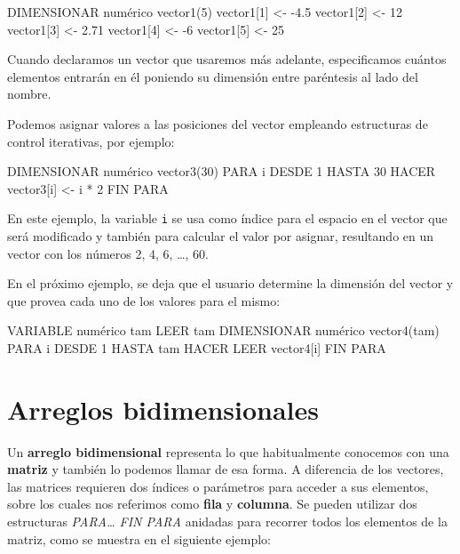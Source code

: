 \documentclass[
]{book}
\newenvironment{Shaded}{\begin{snugshade}}{\end{snugshade}}
\newcommand{\NormalTok}[1]{#1}
\begin{document}
\begin{Shaded}
\begin{Highlighting}[]
\NormalTok{DIMENSIONAR numérico vector1(5)}
\NormalTok{vector1[1] \textless{}{-} {-}4.5}
\NormalTok{vector1[2] \textless{}{-} 12}
\NormalTok{vector1[3] \textless{}{-} 2.71}
\NormalTok{vector1[4] \textless{}{-} {-}6}
\NormalTok{vector1[5] \textless{}{-} 25}
\end{Highlighting}
\end{Shaded}

Cuando declaramos un vector que usaremos más adelante, especificamos cuántos elementos entrarán en él poniendo su dimensión entre paréntesis al lado del nombre.

Podemos asignar valores a las posiciones del vector empleando estructuras de control iterativas, por ejemplo:

\begin{Shaded}
\begin{Highlighting}[]
\NormalTok{DIMENSIONAR numérico vector3(30)}
\NormalTok{PARA i DESDE 1 HASTA 30 HACER}
\NormalTok{    vector3[i] \textless{}{-} i * 2}
\NormalTok{FIN PARA}
\end{Highlighting}
\end{Shaded}

En este ejemplo, la variable \texttt{i} se usa como índice para el espacio en el vector que será modificado y también para calcular el valor por asignar, resultando en un vector con los números 2, 4, 6, \ldots, 60.

En el próximo ejemplo, se deja que el usuario determine la dimensión del vector y que provea cada uno de los valores para el mismo:

\begin{Shaded}
\begin{Highlighting}[]
\NormalTok{VARIABLE numérico tam}
\NormalTok{LEER tam}
\NormalTok{DIMENSIONAR numérico vector4(tam)}
\NormalTok{PARA i DESDE 1 HASTA tam HACER}
\NormalTok{    LEER vector4[i]}
\NormalTok{FIN PARA}
\end{Highlighting}
\end{Shaded}

\hypertarget{arreglos-bidimensionales}{%
\section{Arreglos bidimensionales}\label{arreglos-bidimensionales}}

Un \textbf{arreglo bidimensional} representa lo que habitualmente conocemos con una \textbf{matriz} y también lo podemos llamar de esa forma. A diferencia de los vectores, las matrices requieren dos índices o parámetros para acceder a sus elementos, sobre los cuales nos referimos como \textbf{fila} y \textbf{columna}. Se pueden utilizar dos estructuras \emph{PARA\ldots{} FIN PARA} anidadas para recorrer todos los elementos de la matriz, como se muestra en el siguiente ejemplo:
\end{document}
